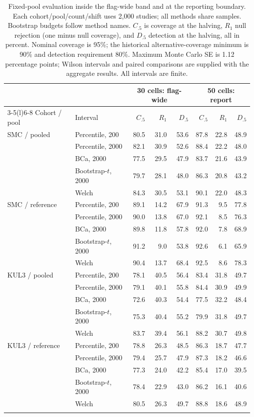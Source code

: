 \begin{table}[htbp]
\centering\small
\caption{Fixed-pool evaluation inside the flag-wide band and at the reporting
boundary. Each cohort/pool/count/shift uses 2{,}000 studies; all methods share
samples. Bootstrap budgets follow method names. $C_{.5}$ is coverage at the
halving, $R_1$ null rejection (one minus null coverage), and $D_{.5}$ detection
at the halving, all in percent. Nominal coverage is 95\%; the historical
alternative-coverage minimum is 90\% and detection requirement 80\%.
Maximum Monte Carlo SE is 1.12 percentage points; Wilson intervals and paired
comparisons are supplied with the aggregate results. All intervals are finite.}
\label{tab:repair}
\begin{tabular}{@{}llrrrrrr@{}}
\toprule
 & & \multicolumn{3}{c}{30 cells: flag-wide} & \multicolumn{3}{c}{50 cells: report} \\
\cmidrule(lr){3-5}\cmidrule(l){6-8}
Cohort / pool & Interval & $C_{.5}$ & $R_1$ & $D_{.5}$ & $C_{.5}$ & $R_1$ & $D_{.5}$ \\
\midrule
SMC / pooled & Percentile, 200 & 80.5 & 31.0 & 53.6 & 87.8 & 22.8 & 48.9 \\
 & Percentile, 2000 & 82.1 & 30.9 & 52.6 & 88.4 & 22.2 & 48.0 \\
 & BCa, 2000 & 77.5 & 29.5 & 47.9 & 83.7 & 21.6 & 43.9 \\
 & Bootstrap-$t$, 2000 & 79.7 & 28.1 & 48.0 & 86.3 & 20.8 & 43.2 \\
 & Welch & 84.3 & 30.5 & 53.1 & 90.1 & 22.0 & 48.3 \\
\addlinespace
SMC / reference & Percentile, 200 & 89.1 & 14.2 & 67.9 & 91.3 & 9.5 & 77.8 \\
 & Percentile, 2000 & 90.0 & 13.8 & 67.0 & 92.1 & 8.5 & 76.3 \\
 & BCa, 2000 & 89.8 & 11.8 & 57.8 & 92.0 & 7.8 & 68.9 \\
 & Bootstrap-$t$, 2000 & 91.2 & 9.0 & 53.8 & 92.6 & 6.1 & 65.9 \\
 & Welch & 90.4 & 13.7 & 68.4 & 92.5 & 8.6 & 78.3 \\
\addlinespace
KUL3 / pooled & Percentile, 200 & 78.1 & 40.5 & 56.4 & 83.4 & 31.8 & 49.7 \\
 & Percentile, 2000 & 79.1 & 40.1 & 55.8 & 84.4 & 30.9 & 49.9 \\
 & BCa, 2000 & 72.6 & 40.3 & 54.4 & 77.5 & 32.2 & 48.4 \\
 & Bootstrap-$t$, 2000 & 75.3 & 40.4 & 55.2 & 79.9 & 31.8 & 49.7 \\
 & Welch & 83.7 & 39.4 & 56.1 & 88.2 & 30.7 & 49.8 \\
\addlinespace
KUL3 / reference & Percentile, 200 & 78.8 & 26.3 & 48.5 & 86.3 & 18.7 & 47.7 \\
 & Percentile, 2000 & 79.4 & 25.7 & 47.9 & 87.3 & 18.2 & 46.6 \\
 & BCa, 2000 & 77.3 & 24.0 & 42.2 & 85.4 & 17.0 & 39.5 \\
 & Bootstrap-$t$, 2000 & 78.4 & 22.9 & 43.0 & 86.2 & 16.1 & 40.6 \\
 & Welch & 80.5 & 26.3 & 49.7 & 88.8 & 18.6 & 48.9 \\
\addlinespace
\bottomrule
\end{tabular}
\end{table}
